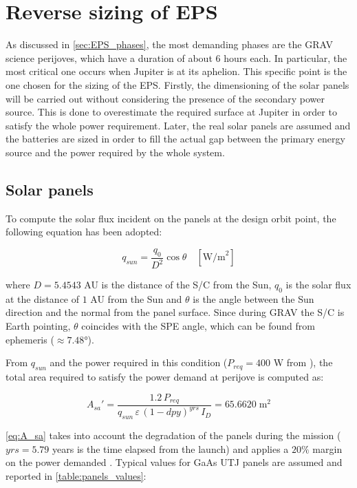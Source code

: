 \section{Reverse sizing of EPS}
\label{sec:EPS_sizing}

As discussed in \autoref{sec:EPS_phases}, the most demanding phases are the GRAV science perijoves, which have a duration of about 6 hours each. In particular, the most critical one occurs when Jupiter is at its aphelion.
This specific point is the one chosen for the sizing of the EPS.
Firstly, the dimensioning of the solar panels will be carried out without considering the presence of the secondary power source.
This is done to overestimate the required surface at Jupiter in order to satisfy the whole power requirement.
Later, the real solar panels are assumed and the batteries are sized in order to fill the actual gap between the primary energy source and the power required by the whole system.


\subsection{Solar panels}
\label{subsec:solar_panels_sizing}

To compute the solar flux incident on the panels at the design orbit point, the following equation has been adopted:

\begin{equation}
    q_{sun} = \frac{q_0}{D^2} \cos \theta \quad [ \textrm{W/m}^2 ]
\end{equation}

where $D = 5.4543$ AU is the distance of the S/C from the Sun, $q_0$ is the solar flux at the distance of $1$ AU from the Sun and $\theta$ is the angle between the Sun direction and the normal from the panel surface.
Since during GRAV the S/C is Earth pointing, $\theta$ coincides with the SPE angle, which can be found from ephemeris ($\approx 7.48$°).

From $q_{sun}$ and the power required in this condition ($P_{req} = 400$ W from \mref), the total area required to satisfy the power demand at perijove is computed as:

\begin{equation}
    A_{sa}' = \frac{1.2 \, P_{req}}{q_{sun} \, \varepsilon \, \left( 1 - dpy \right) ^ {yrs} \, I_D} = 65.6620 \; \textrm{m}^2
    \label{eq:A_sa}
\end{equation}

\autoref{eq:A_sa} takes into account the degradation of the panels during the mission ($yrs = 5.79$ years is the time elapsed from the launch) and applies a $20\%$ margin on the power demanded \mref.
Typical values for GaAs UTJ panels are assumed and reported in \autoref{table:panels_values}:

